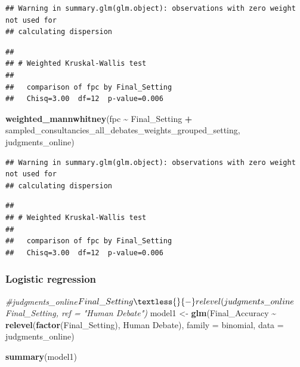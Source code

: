 \documentclass[
]{article}
\newenvironment{Shaded}{\begin{snugshade}}{\end{snugshade}}
\newcommand{\AttributeTok}[1]{\textcolor[rgb]{0.13,0.29,0.53}{#1}}
\newcommand{\CommentTok}[1]{\textcolor[rgb]{0.56,0.35,0.01}{\textit{#1}}}
\newcommand{\FunctionTok}[1]{\textcolor[rgb]{0.13,0.29,0.53}{\textbf{#1}}}
\newcommand{\NormalTok}[1]{#1}
\newcommand{\OtherTok}[1]{\textcolor[rgb]{0.56,0.35,0.01}{#1}}
\newcommand{\SpecialCharTok}[1]{\textcolor[rgb]{0.81,0.36,0.00}{\textbf{#1}}}
\newcommand{\StringTok}[1]{\textcolor[rgb]{0.31,0.60,0.02}{#1}}
\begin{document}
\begin{verbatim}
## Warning in summary.glm(glm.object): observations with zero weight not used for
## calculating dispersion
\end{verbatim}

\begin{verbatim}
## 
## # Weighted Kruskal-Wallis test
## 
##   comparison of fpc by Final_Setting
##   Chisq=3.00  df=12  p-value=0.006
\end{verbatim}

\begin{Shaded}
\begin{Highlighting}[]
\FunctionTok{weighted\_mannwhitney}\NormalTok{(fpc }\SpecialCharTok{\textasciitilde{}}\NormalTok{ Final\_Setting }\SpecialCharTok{+}\NormalTok{ sampled\_consultancies\_all\_debates\_weights\_grouped\_setting, judgments\_online)}
\end{Highlighting}
\end{Shaded}

\begin{verbatim}
## Warning in summary.glm(glm.object): observations with zero weight not used for
## calculating dispersion
\end{verbatim}

\begin{verbatim}
## 
## # Weighted Kruskal-Wallis test
## 
##   comparison of fpc by Final_Setting
##   Chisq=3.00  df=12  p-value=0.006
\end{verbatim}

\subsubsection{Logistic regression}\label{logistic-regression}

\begin{Shaded}
\begin{Highlighting}[]
\CommentTok{\#judgments\_online$Final\_Setting \textless{}{-} relevel(judgments\_online$Final\_Setting, ref = "Human Debate")}
\NormalTok{model1 }\OtherTok{\textless{}{-}} \FunctionTok{glm}\NormalTok{(Final\_Accuracy }\SpecialCharTok{\textasciitilde{}} \FunctionTok{relevel}\NormalTok{(}\FunctionTok{factor}\NormalTok{(Final\_Setting), }\StringTok{\textquotesingle{}Human Debate\textquotesingle{}}\NormalTok{), }\AttributeTok{family =} \StringTok{\textquotesingle{}binomial\textquotesingle{}}\NormalTok{, }\AttributeTok{data =}\NormalTok{ judgments\_online)}

\FunctionTok{summary}\NormalTok{(model1)}
\end{Highlighting}
\end{Shaded}
\end{document}
